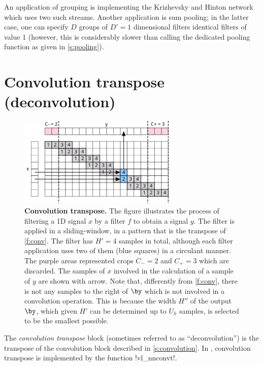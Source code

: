 An application of grouping is implementing the Krizhevsky and Hinton network~\cite{krizhevsky12imagenet} which uses two such streams. Another application is sum pooling; in the latter case, one can specify $D$ groups of $D'=1$ dimensional filters identical filters of value 1 (however, this is considerably slower than calling the dedicated pooling function as given in \autoref{s:pooling}).

\section{Convolution transpose (deconvolution)}\label{s:convt}

\begin{figure}[t]
	\centering
	\includegraphics[width=0.7\textwidth]{figures/svg/convt}
	\caption{\textbf{Convolution transpose.} The figure illustrates the process of filtering a 1D signal $x$ by a filter $f$ to obtain a signal $y$. The filter is applied in a sliding-window, in a pattern that is the transpose of \autoref{f:conv}. The filter has $H'=4$ samples in total, although each filter application uses two of them (blue squares) in a circulant manner. The purple areas represented crops $C_-=2$ and $C_+=3$ which are discarded.  The samples of $x$ involved in the calculation of a sample of $y$ are shown with arrow. Note that, differently from \autoref{f:conv}, there is not any samples to the right of $\by$ which is not involved in a convolution operation. This is because the width $H''$ of the output $\by$, which given $H'$ can be determined up to $U_h$ samples, is selected to be the smallest possible.}\label{f:convt}
\end{figure}

The \emph{convolution transpose} block (sometimes referred to as ``deconvolution'') is the transpose of the convolution block described in \autoref{s:convolution}. In \matconvnet, convolution transpose is  implemented by the function !vl_nnconvt!. 

